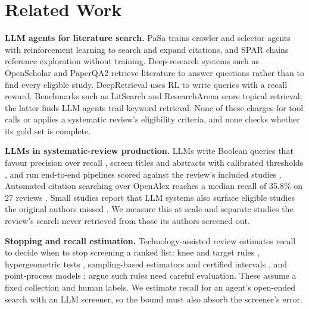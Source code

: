 \section{Related Work}

\textbf{LLM agents for literature search.}
PaSa \citep{he2025pasa} trains crawler and selector agents with reinforcement learning to search and
expand citations, and SPAR \citep{shi2025spar} chains reference exploration without training. Deep-research
systems such as OpenScholar \citep{asai2026openscholar} and PaperQA2 \citep{skarlinski2024paperqa2} retrieve
literature to answer questions rather than to find every eligible study. DeepRetrieval
\citep{jiang2025deepretrieval} uses RL to write queries with a recall reward. Benchmarks such as LitSearch
\citep{ajith2024litsearch} and ResearchArena \citep{kang2024researcharena} score topical retrieval; the latter
finds LLM agents trail keyword retrieval. None of these charges for tool calls or applies a systematic review's
eligibility criteria, and none checks whether its gold set is complete.

\textbf{LLMs in systematic-review production.}
LLMs write Boolean queries that favour precision over recall \citep{wang2023chatgptboolean}, screen titles and
abstracts with calibrated thresholds \citep{wang2024zeroshot,guo2024screening,khraisha2024gpt4}, and run
end-to-end pipelines scored against the review's included studies \citep{wang2025trialmind,cao2025ottosr}.
Automated citation searching over OpenAlex reaches a median recall of 35.8\% on 27 reviews
\citep{rajit2025citation}. Small studies report that LLM systems also surface eligible studies the original
authors missed \citep{cao2025ottosr,carrier2026aisr}. We measure this at scale and separate studies the
review's search never retrieved from those its authors screened out.

\textbf{Stopping and recall estimation.}
Technology-assisted review estimates recall to decide when to stop screening a ranked list: knee and target
rules \citep{cormack2016engineering}, hypergeometric tests \citep{callaghan2020stopping}, sampling-based
estimators and certified intervals \citep{li2020stop,lewis2021certifying}, and point-process models
\citep{stevenson2023pointprocess}; \citet{callaghan2024robust} argue such rules need careful evaluation. These
assume a fixed collection and human labels. We estimate recall for an agent's open-ended search with an LLM
screener, so the bound must also absorb the screener's error.

